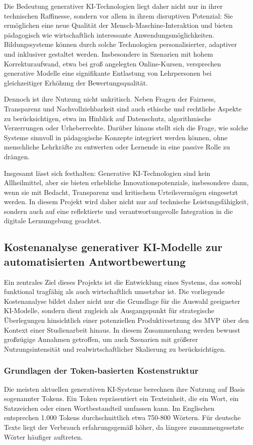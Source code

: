 \documentclass[a4paper,12pt]{article}
\begin{document}
Die Bedeutung generativer KI-Technologien liegt daher nicht nur in ihrer technischen Raffinesse, sondern vor allem in ihrem disruptiven Potenzial: Sie ermöglichen eine neue Qualität der Mensch-Maschine-Interaktion und bieten pädagogisch wie wirtschaftlich interessante Anwendungsmöglichkeiten. Bildungssysteme können durch solche Technologien personalisierter, adaptiver und inklusiver gestaltet werden. Insbesondere in Szenarien mit hohem Korrekturaufwand, etwa bei groß angelegten Online-Kursen, versprechen generative Modelle eine signifikante Entlastung von Lehrpersonen bei gleichzeitiger Erhöhung der Bewertungsqualität.

Dennoch ist ihre Nutzung nicht unkritisch. Neben Fragen der Fairness, Transparenz und Nachvollziehbarkeit sind auch ethische und rechtliche Aspekte zu berücksichtigen, etwa im Hinblick auf Datenschutz, algorithmische Verzerrungen oder Urheberrechte. Darüber hinaus stellt sich die Frage, wie solche Systeme sinnvoll in pädagogische Konzepte integriert werden können, ohne menschliche Lehrkräfte zu entwerten oder Lernende in eine passive Rolle zu drängen.

Insgesamt lässt sich festhalten: Generative KI-Technologien sind kein Allheilmittel, aber sie bieten erhebliche Innovationspotenziale, insbesondere dann, wenn sie mit Bedacht, Transparenz und kritischem Urteilsvermögen eingesetzt werden. In diesem Projekt wird daher nicht nur auf technische Leistungsfähigkeit, sondern auch auf eine reflektierte und verantwortungsvolle Integration in die digitale Lernumgebung geachtet.

\subsection{Kostenanalyse generativer KI-Modelle zur automatisierten Antwortbewertung}
Ein zentrales Ziel dieses Projekts ist die Entwicklung eines Systems, das sowohl funktional tragfähig als auch wirtschaftlich umsetzbar ist. Die vorliegende Kostenanalyse bildet daher nicht nur die Grundlage für die Auswahl geeigneter KI-Modelle, sondern dient zugleich als Ausgangspunkt für strategische Überlegungen hinsichtlich einer potenziellen Produktivsetzung des MVP über den Kontext einer Studienarbeit hinaus. In diesem Zusammenhang werden bewusst großzügige Annahmen getroffen, um auch Szenarien mit größerer Nutzungsintensität und realwirtschaftlicher Skalierung zu berücksichtigen.

\subsubsection{Grundlagen der Token-basierten Kostenstruktur}
Die meisten aktuellen generativen KI-Systeme berechnen ihre Nutzung auf Basis sogenannter Tokens. Ein Token repräsentiert ein Texteinheit, die ein Wort, ein Satzzeichen oder einen Wortbestandteil umfassen kann. Im Englischen entsprechen 1.000 Tokens durchschnittlich etwa 750-800 Wörtern. Für deutsche Texte liegt der Verbrauch erfahrungsgemäß höher, da längere zusammengesetzte Wörter häufiger auftreten.
\end{document}
